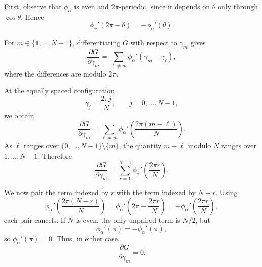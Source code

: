 \documentclass{article}
\begin{document}






First, observe that $\phi_\alpha$ is even and $2\pi$-periodic, since it
depends on $\theta$ only through $\cos\theta$. Hence
\[
\phi_\alpha'(2\pi-\theta)
=
-\phi_\alpha'(\theta).
\]

For $m\in\{1,\dots,N-1\}$, differentiating $G$ with respect to
$\gamma_m$ gives
\[
\frac{\partial G}{\partial\gamma_m}
=
\sum_{\ell\neq m}
\phi_\alpha'(\gamma_m-\gamma_\ell),
\]
where the differences are modulo $2\pi$.

At the equally spaced configuration
\[
\gamma_j=\frac{2\pi j}{N},
\qquad j=0,\dots,N-1,
\]
we obtain
\[
\frac{\partial G}{\partial\gamma_m}
=
\sum_{\ell\neq m}
\phi_\alpha'\left(
\frac{2\pi(m-\ell)}{N}
\right).
\]
As $\ell$ ranges over $\{0,\dots,N-1\}\setminus\{m\}$, the quantity
$m-\ell$ modulo $N$ ranges over $1,\dots,N-1$. Therefore
\[
\frac{\partial G}{\partial\gamma_m}
=
\sum_{r=1}^{N-1}
\phi_\alpha'\left(\frac{2\pi r}{N}\right).
\]

We now pair the term indexed by $r$ with the term indexed by $N-r$.
Using
\[
\phi_\alpha'\left(
\frac{2\pi(N-r)}{N}
\right)
=
\phi_\alpha'\left(
2\pi-\frac{2\pi r}{N}
\right)
=
-\phi_\alpha'\left(
\frac{2\pi r}{N}
\right),
\]
each pair cancels. If $N$ is even, the only unpaired term is $N/2$, but
\[
\phi_\alpha'(\pi)
=
-\phi_\alpha'(\pi),
\]
so $\phi_\alpha'(\pi)=0$. Thus, in either case,
\[
\frac{\partial G}{\partial\gamma_m}=0.
\]
\end{document}
